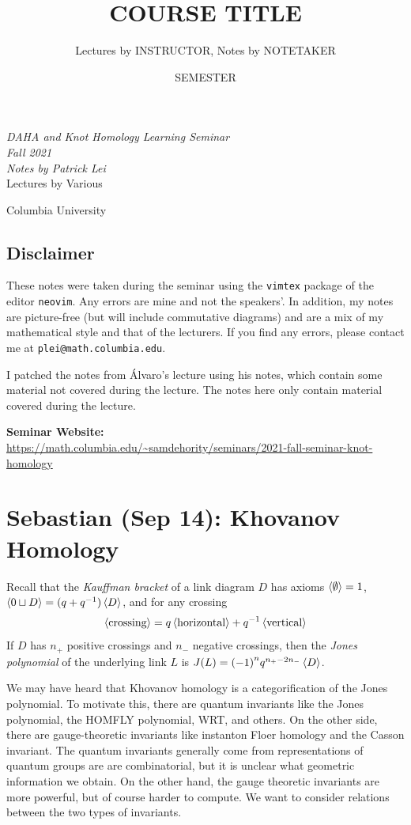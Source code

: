 \documentclass[leqno, openany]{memoir}
\title{COURSE TITLE}
\author{Lectures by INSTRUCTOR, Notes by NOTETAKER}
\date{SEMESTER}
\theoremstyle{definition}
\theoremstyle{remark}
\theoremstyle{plain}
\theoremstyle{definition}
\theoremstyle{remark}
\newcommand{\1}{\mathbf{1}}
\newcommand{\2}{\mathbf{2}}
\newcommand{\3}{\mathbf{3}}
\newcommand*{\titleSW}
    {\begingroup%
    \raggedleft
    \vspace*{\baselineskip}
    {\Huge\itshape DAHA and Knot Homology Learning Seminar \\ Fall 2021}\\[\baselineskip]
    {\large\itshape Notes by Patrick Lei}\\[0.2\textheight]
    {\Large Lectures by Various}\par
    \vfill
    {\Large \sffamily Columbia University}
    \vspace*{\baselineskip}
\endgroup}
\begin{document}
    
\begin{titlingpage}
\titleSW
\end{titlingpage}

\thispagestyle{empty}
\section*{Disclaimer}%
\label{sec:disclaimer}

These notes were taken during the seminar using the \texttt{vimtex} package of
the editor \texttt{neovim}.  Any errors are mine and not the speakers'.  In
addition, my notes are picture-free (but will include commutative diagrams) and
are a mix of my mathematical style and that of the lecturers.  If you find any
errors, please contact me at \texttt{plei@math.columbia.edu}.

I patched the notes from \'Alvaro's lecture using his notes, which contain some
material not covered during the lecture. The notes here only contain material
covered during the lecture.

\vspace*{1cm}

\noindent\textbf{Seminar Website:}\\
\url{https://math.columbia.edu/~samdehority/seminars/2021-fall-seminar-knot-homology} \newpage

\tableofcontents

\chapter{Sebastian (Sep 14): Khovanov Homology}%
\label{cha:sebastian_sep_14_khovanov_homology}

Recall that the \textit{Kauffman bracket} of a link diagram $D$ has axioms $\ev{\emptyset} = 1$, $\ev{0 \sqcup D} = (q+q^{-1}) \ev{D}$, and for any crossing
\[ \ev{\text{crossing}} = q \ev{\text{horizontal}} + q^{-1} \ev{\text{vertical}} \]
If $D$ has $n_+$ positive crossings and $n_-$ negative crossings, then the \textit{Jones polynomial} of the underlying link $L$ is $J(L) = {(-1)}^n q^{n_+ - 2n_-} \ev{D}$.

We may have heard that Khovanov homology is a categorification of the Jones polynomial. To motivate this, there are quantum invariants like the Jones polynomial, the HOMFLY polynomial, WRT, and others. On the other side, there are gauge-theoretic invariants like instanton Floer homology and the Casson invariant. The quantum invariants generally come from representations of quantum groups are are combinatorial, but it is unclear what geometric information we obtain. On the other hand, the gauge theoretic invariants are more powerful, but of course harder to compute. We want to consider relations between the two types of invariants.
\end{document}
